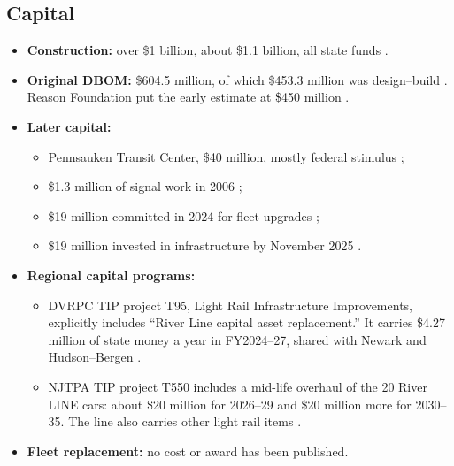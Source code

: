 \documentclass[11pt]{article}
\begin{document}
\subsection{Capital}
\begin{itemize}
\item \textbf{Construction:} over \$1 billion, about \$1.1 billion, all state funds \citep{camdenhistory2004,njtod2026,chatman2010}.
\item \textbf{Original DBOM:} \$604.5 million, of which \$453.3 million was design--build \citep{njdot2000groundbreaking}. Reason Foundation put the early estimate at \$450 million \citep{reason2004}.
\item \textbf{Later capital:}
  \begin{itemize}
  \item Pennsauken Transit Center, \$40 million, mostly federal stimulus \citep{inquirer2013pennsauken};
  \item \$1.3 million of signal work in 2006 \citep{njt2006latenight};
  \item \$19 million committed in 2024 for fleet upgrades \citep{cbs2024meeting};
  \item \$19 million invested in infrastructure by November 2025 \citep{centraljersey2025}.
  \end{itemize}
\item \textbf{Regional capital programs:}
  \begin{itemize}
  \item DVRPC TIP project T95, Light Rail Infrastructure Improvements, explicitly includes ``River Line capital asset replacement.'' It carries \$4.27 million of state money a year in FY2024--27, shared with Newark and Hudson--Bergen \citep{dvrpc_t95}.
  \item NJTPA TIP project T550 includes a mid-life overhaul of the 20 River LINE cars: about \$20 million for 2026--29 and \$20 million more for 2030--35. The line also carries other light rail items \citep{njtpa_tip}.
  \end{itemize}
\item \textbf{Fleet replacement:} no cost or award has been published.
\end{itemize}
\end{document}
